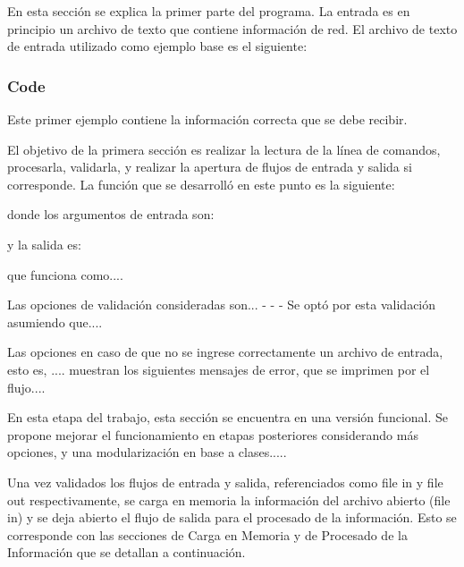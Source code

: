 \documentclass[10pt,a4paper]{report}
\begin{document}
En esta sección se explica la primer parte del programa. La entrada es en principio un archivo de texto que contiene información de red.
El archivo de texto de entrada utilizado como ejemplo base es el siguiente:\\

\subsubsection*{Code}


Este primer ejemplo contiene la información correcta que se debe recibir. 

El objetivo de la primera sección es realizar la lectura de la línea de comandos, procesarla, validarla, y realizar la apertura de flujos de entrada y salida si corresponde.
La función que se desarrolló en este punto es la siguiente:

donde los argumentos de entrada son:

y la salida es:

que funciona como....


Las opciones de validación consideradas son...
-
-
-
Se optó por esta validación asumiendo que....

Las opciones en caso de que no se ingrese correctamente un archivo de entrada, esto es, ....
muestran los siguientes mensajes de error, que se imprimen por el flujo....


En esta etapa del trabajo, esta sección se encuentra en una versión funcional. Se propone mejorar el funcionamiento en etapas posteriores considerando más opciones, y una modularización en base a clases.....

Una vez validados los flujos de entrada y salida, referenciados como file in y file out respectivamente, se  carga en memoria la información del archivo abierto (file in) y se deja abierto el flujo de salida para el procesado de la información. Esto se corresponde con las secciones de Carga en Memoria y de Procesado de la Información que se detallan a continuación.
\end{document}
